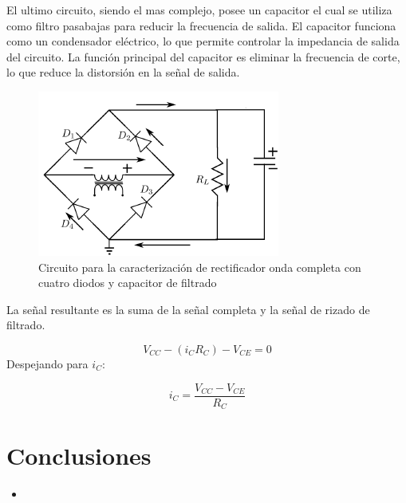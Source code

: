 \documentclass[10pt,letterpaper]{article}
\begin{document}
El ultimo circuito, siendo el mas complejo, posee un capacitor el cual 
se utiliza como filtro pasabajas para reducir la frecuencia de salida. El capacitor
funciona como un condensador eléctrico, lo que permite controlar la impedancia de salida
del circuito. La función principal del capacitor es eliminar la frecuencia de corte,
lo que reduce la distorsión en la señal de salida.

\begin{figure}[H]
	\centering
	\includegraphics[scale=1]{OndaCapacitorFiltrado.png}
	\caption{Circuito para la caracterización de rectificador onda completa con cuatro diodos y capacitor de filtrado}
	\label{fig:enter-label}
\end{figure}

La señal resultante es la suma de la señal completa y la señal de rizado de filtrado.

\begin{equation}
	V_{CC}-(i_CR_{C})-V_{CE}=0
\end{equation}
Despejando para $i_C$:

\begin{equation}
	i_C=\frac{ V_{CC}-V_{CE}}{R_{C}}
\end{equation}




\section{Conclusiones}
\begin{itemize}
	\item








\end{itemize}

\begin{thebibliography}{9}

\end{thebibliography}
\end{document}
